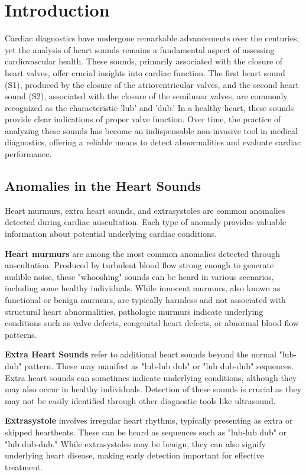 \section{Introduction} \label{introduction}
Cardiac diagnostics have undergone remarkable advancements over the centuries, yet the analysis of heart sounds remains a fundamental aspect of assessing cardiovascular health. These sounds, primarily associated with the closure of heart valves, offer crucial insights into cardiac function. The first heart sound (S1), produced by the closure of the atrioventricular valves, and the second heart sound (S2), associated with the closure of the semilunar valves, are commonly recognized as the characteristic 'lub' and 'dub.' In a healthy heart, these sounds provide clear indications of proper valve function. Over time, the practice of analyzing these sounds has become an indispensable non-invasive tool in medical diagnostics, offering a reliable means to detect abnormalities and evaluate cardiac performance.

\subsection{Anomalies in the Heart Sounds}
Heart murmurs, extra heart sounds, and extrasystoles are common anomalies detected during cardiac auscultation. Each type of anomaly provides valuable information about potential underlying cardiac conditions.

\textbf{Heart murmurs} are among the most common anomalies detected through auscultation. Produced by turbulent blood flow strong enough to generate audible noise, these "whooshing" sounds can be heard in various scenarios, including some healthy individuals. While innocent murmurs, also known as functional or benign murmurs, are typically harmless and not associated with structural heart abnormalities, pathologic murmurs indicate underlying conditions such as valve defects, congenital heart defects, or abnormal blood flow patterns. 

\textbf{Extra Heart Sounds} refer to additional heart sounds beyond the normal "lub-dub" pattern. These may manifest as "lub-lub dub" or "lub dub-dub" sequences. Extra heart sounds can sometimes indicate underlying conditions, although they may also occur in healthy individuals. Detection of these sounds is crucial as they may not be easily identified through other diagnostic tools like ultrasound.

\textbf{Extrasystole} involves irregular heart rhythms, typically presenting as extra or skipped heartbeats. These can be heard as sequences such as "lub-lub dub" or "lub dub-dub." While extrasystoles may be benign, they can also signify underlying heart disease, making early detection important for effective treatment.

